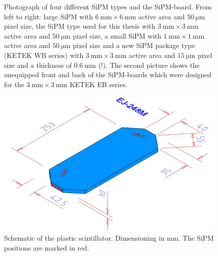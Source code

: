 \begin{figure}[H]
	\hfill
	\hfill
	\caption[Various SiPM types]{Photograph of four different SiPM types and the SiPM-board. From left to right: large SiPM with $\SI{6}{\milli\meter}\times\SI{6}{\milli\meter}$ active area and $\SI{50}{\micro\meter}$ pixel size, the SiPM type used for this thesis with $\SI{3}{\milli\meter}\times\SI{3}{\milli\meter}$ active area and $\SI{50}{\micro\meter}$ pixel size, a small SiPM with $\SI{1}{\milli\meter}\times\SI{1}{\milli\meter}$ active area and $\SI{50}{\micro\meter}$ pixel size and a new SiPM package type (KETEK WB series) with $\SI{3}{\milli\meter}\times\SI{3}{\milli\meter}$ active area and $\SI{15}{\micro\meter}$ pixel size and a thickness of $\SI{0.6}{\milli\meter}$ (!). The second picture shows the unequipped front and back of the SiPM-boards which were designed for the $\SI{3}{\milli\meter}\times\SI{3}{\milli\meter}$ KETEK EB series. }
	\label{ap:C:Siverse_SiPMs}
\end{figure}

\newpage

\begin{figure}[H]
	\centering
	\includegraphics[width=1\textwidth]{./graphics/ch5/plastic.png}
	\caption[Schematic of the plastic scintillator]{Schematic of the plastic scintillator. Dimensioning in $\si{\milli\meter}$. The SiPM positions are marked in red.}    
	\label{ap:C:plastic}
\end{figure}

